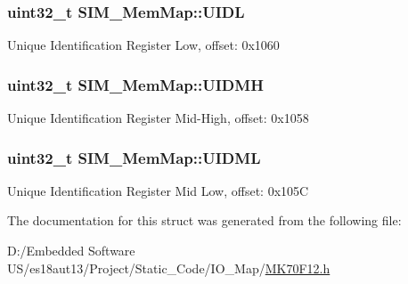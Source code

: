 \subsubsection[{U\+I\+D\+L}]{\setlength{\rightskip}{0pt plus 5cm}uint32\+\_\+t S\+I\+M\+\_\+\+Mem\+Map\+::\+U\+I\+D\+L}\label{struct_s_i_m___mem_map_ac23a694afa8d84e55fc43ff0c0ec1b29}
Unique Identification Register Low, offset\+: 0x1060 \hypertarget{struct_s_i_m___mem_map_af4fb6d5bc3fa71f9c905570d87a2e93f}{}
\subsubsection[{U\+I\+D\+M\+H}]{\setlength{\rightskip}{0pt plus 5cm}uint32\+\_\+t S\+I\+M\+\_\+\+Mem\+Map\+::\+U\+I\+D\+M\+H}\label{struct_s_i_m___mem_map_af4fb6d5bc3fa71f9c905570d87a2e93f}
Unique Identification Register Mid-\/\+High, offset\+: 0x1058 \hypertarget{struct_s_i_m___mem_map_a51e871d8ac13db8b605b6ec1b3292be4}{}
\subsubsection[{U\+I\+D\+M\+L}]{\setlength{\rightskip}{0pt plus 5cm}uint32\+\_\+t S\+I\+M\+\_\+\+Mem\+Map\+::\+U\+I\+D\+M\+L}\label{struct_s_i_m___mem_map_a51e871d8ac13db8b605b6ec1b3292be4}
Unique Identification Register Mid Low, offset\+: 0x105\+C 

The documentation for this struct was generated from the following file\+:\begin{DoxyCompactItemize}
\item 
D\+:/\+Embedded Software U\+S/es18aut13/\+Project/\+Static\+\_\+\+Code/\+I\+O\+\_\+\+Map/\hyperlink{_m_k70_f12_8h}{M\+K70\+F12.\+h}\end{DoxyCompactItemize}
